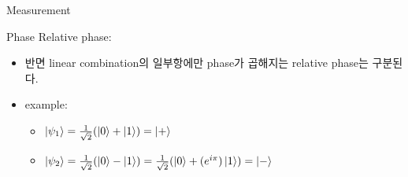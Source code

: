 \documentclass[9pt]{beamer}
\begin{document}
\begin{section}{Measurement}
\begin{frame}{Phase}
            \vspace{1cm}
            Relative phase:
            \begin{itemize}
                \item 반면 linear combination의 일부항에만 phase가 곱해지는 relative phase는 구분된다.
                \item example:
                \begin{itemize}
                    \item $\ket{\psi_1} = \frac{1}{\sqrt 2} (\ket0 + \ket 1) = \ket{+}$
                    \item $\ket{\psi_2} = \frac{1}{\sqrt 2} (\ket 0 - \ket 1) = \frac{1}{\sqrt 2} (\ket 0 + (e^{i\pi}) \ket 1) =\ket{-}$
                \end{itemize}
            \end{itemize}

        \end{frame}
    \end{section}
\end{document}
